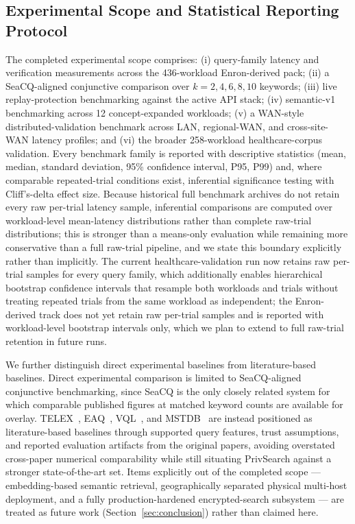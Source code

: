 \subsection{Experimental Scope and Statistical Reporting Protocol}
\label{4C}
The completed experimental scope comprises: (i) query-family latency and verification measurements across the 436-workload Enron-derived pack; (ii) a SeaCQ-aligned conjunctive comparison over $k=2,4,6,8,10$ keywords; (iii) live replay-protection benchmarking against the active API stack; (iv) semantic-v1 benchmarking across 12 concept-expanded workloads; (v) a WAN-style distributed-validation benchmark across LAN, regional-WAN, and cross-site-WAN latency profiles; and (vi) the broader 258-workload healthcare-corpus validation. Every benchmark family is reported with descriptive statistics (mean, median, standard deviation, 95\% confidence interval, P95, P99) and, where comparable repeated-trial conditions exist, inferential significance testing with Cliff's-delta effect size. Because historical full benchmark archives do not retain every raw per-trial latency sample, inferential comparisons are computed over workload-level mean-latency distributions rather than complete raw-trial distributions; this is stronger than a means-only evaluation while remaining more conservative than a full raw-trial pipeline, and we state this boundary explicitly rather than implicitly. The current healthcare-validation run now retains raw per-trial samples for every query family, which additionally enables hierarchical bootstrap confidence intervals that resample both workloads and trials without treating repeated trials from the same workload as independent; the Enron-derived track does not yet retain raw per-trial samples and is reported with workload-level bootstrap intervals only, which we plan to extend to full raw-trial retention in future runs.

We further distinguish direct experimental baselines from literature-based baselines. Direct experimental comparison is limited to SeaCQ-aligned conjunctive benchmarking, since SeaCQ is the only closely related system for which comparable published figures at matched keyword counts are available for overlay. TELEX~\cite{WuHaotian}, EAQ~\cite{Yin}, VQL~\cite{WuHaotianPeng}, and MSTDB~\cite{Zhou} are instead positioned as literature-based baselines through supported query features, trust assumptions, and reported evaluation artifacts from the original papers, avoiding overstated cross-paper numerical comparability while still situating PrivSearch against a stronger state-of-the-art set. Items explicitly out of the completed scope --- embedding-based semantic retrieval, geographically separated physical multi-host deployment, and a fully production-hardened encrypted-search subsystem --- are treated as future work (Section~\ref{sec:conclusion}) rather than claimed here.
